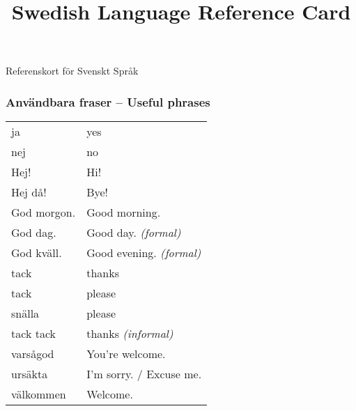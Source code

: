 \documentclass[14pt]{refcard} %
\title{Swedish Language Reference Card}
\begin{document}
\centering

\maketitle
\vspace{-1ex}
Referenskort för Svenskt Språk

\subsubsection{Användbara fraser -- Useful phrases}
\vspace{-1ex}
\begin{tabular}{ll}
ja                     & yes                            \\
nej                    & no                             \\[1ex]

Hej!                   & Hi!                            \\
Hej då!                & Bye!                           \\
God morgon.            & Good morning.                  \\
God dag.               & Good day. \emph{(formal)}      \\
God kväll.             & Good evening. \emph{(formal)}  \\[1ex]

tack                   & thanks                         \\
tack                   & please                         \\
snälla                 & please                         \\
tack tack              & thanks \emph{(informal)}       \\
varsågod               & You're welcome.                \\[1ex]

ursäkta                & I'm sorry. / Excuse me.        \\[1ex]

välkommen              & Welcome.                       \\[1ex]
\end{tabular}

\pagebreak
\end{document}
